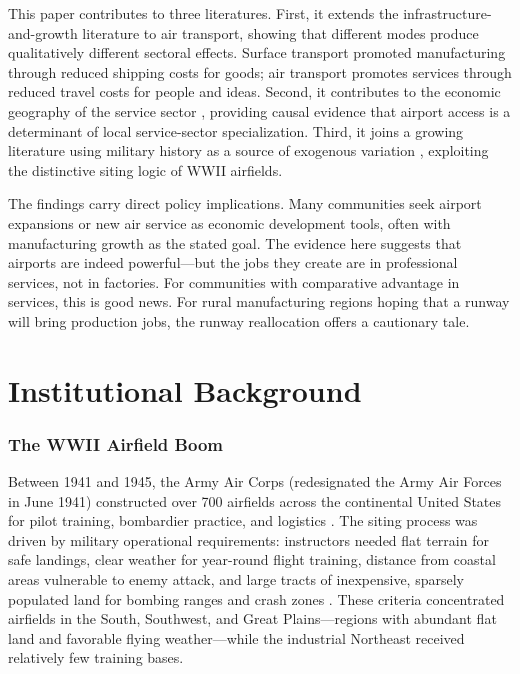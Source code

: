 \documentclass[12pt]{article}
\begin{document}
This paper contributes to three literatures. First, it extends the infrastructure-and-growth literature \citep{donaldson2016, duranton2012, feyrer2009, redding2017} to air transport, showing that different modes produce qualitatively different sectoral effects. Surface transport promoted manufacturing through reduced shipping costs for goods; air transport promotes services through reduced travel costs for people and ideas. Second, it contributes to the economic geography of the service sector \citep{davis2002, moretti2012}, providing causal evidence that airport access is a determinant of local service-sector specialization. Third, it joins a growing literature using military history as a source of exogenous variation \citep{fishback2005, lewis2012, acemoglu2015}, exploiting the distinctive siting logic of WWII airfields.

The findings carry direct policy implications. Many communities seek airport expansions or new air service as economic development tools, often with manufacturing growth as the stated goal. The evidence here suggests that airports are indeed powerful---but the jobs they create are in professional services, not in factories. For communities with comparative advantage in services, this is good news. For rural manufacturing regions hoping that a runway will bring production jobs, the runway reallocation offers a cautionary tale.

\section{Institutional Background}

\subsubsection*{The WWII Airfield Boom} Between 1941 and 1945, the Army Air Corps (redesignated the Army Air Forces in June 1941) constructed over 700 airfields across the continental United States for pilot training, bombardier practice, and logistics \citep{bilstein1984}. The siting process was driven by military operational requirements: instructors needed flat terrain for safe landings, clear weather for year-round flight training, distance from coastal areas vulnerable to enemy attack, and large tracts of inexpensive, sparsely populated land for bombing ranges and crash zones \citep{mueller1989}. These criteria concentrated airfields in the South, Southwest, and Great Plains---regions with abundant flat land and favorable flying weather---while the industrial Northeast received relatively few training bases.
\end{document}
